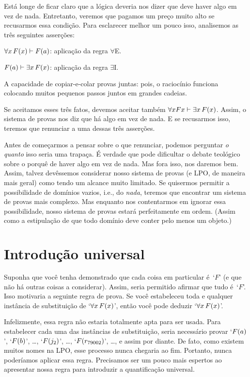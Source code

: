  
Est\'a longe de ficar claro que a l\'ogica deveria nos dizer que deve haver algo em vez de nada. Entretanto, veremos que pagamos um pre\c co muito alto se recusarmos essa condi\c c\~ao. Para esclarecer melhor um pouco isso, analisemos as tr\^es seguintes asser\c c\~oes:
	\begin{ebullet}
		\item $\forall x\,\mathord{F}(x) \vdash \mathord{F}(a)$:  aplica\c c\~ao da regra  $\forall$E.
		\item $\mathord{F}(a) \vdash \exists x\,\mathord{F}(x)$:  aplica\c c\~ao da regra $\exists$I.
		\item A capacidade de copiar-e-colar provas juntas: pois, o racioc\'inio funciona colocando muitos pequenos passos juntos em grandes cadeias.
	\end{ebullet}
Se aceitamos esses tr\^es fatos, devemos aceitar tamb\'em $\forall xFx \vdash \exists x\,\mathord{F}(x)$.  Assim, o sistema de provas nos diz que h\'a algo em vez de nada. E se recusarmos isso, teremos que renunciar a uma dessas tr\^es asser\c c\~oes. 


Antes de come\c carmos a pensar sobre o que renunciar, podemos perguntar \emph{o quanto} isso seria uma trapa\c ca. \'E verdade que pode dificultar o debate teol\'ogico sobre o porqu\^e de haver algo em vez de nada. Mas fora isso, nos daremos bem. Assim, talvez dev\^essemos considerar nosso sistema de provas (e LPO, de maneira mais geral) como tendo um alcance muito limitado. Se quisermos permitir a possibilidade de dom\'inios vazios, i.e., do \emph{nada}, teremos que encontrar um sistema de provas mais complexo. Mas enquanto nos contentarmos em ignorar essa possibilidade, nosso sistema de provas estar\'a perfeitamente em ordem. (Assim como a estipula\c c\~ao de que todo dom\'inio deve conter pelo menos um objeto.)

\section{Introdu\c c\~ao universal}
Suponha que voc\^e tenha demonstrado que cada coisa em particular \'e~`$F$' (e que n\~ao h\'a outras coisas a considerar). Assim, seria permitido afirmar que tudo \'e~`$F$'. Isso motivaria a seguinte regra de prova. Se voc\^e estabeleceu toda e qualquer inst\^ancia de substitui\c c\~ao de `$\forall x\,\mathord{F}(x)$', ent\~ao voc\^e pode deduzir `$\forall x\,\mathord{F}(x)$'. 
 
 Infelizmente, essa regra n\~ao estaria  totalmente apta para ser usada. Para estabelecer cada uma das inst\^ancias de substitui\c c\~ao, seria necess\'ario provar  `$\mathord{F}(a)$', `$\mathord{F}(b)$', \dots, `$\mathord{F}(j_2)$', \dots, `$\mathord{F}(r_{79002})$', \ldots, e assim por diante. De fato, como existem muitos nomes na LPO, esse processo nunca chegaria ao fim. Portanto, nunca poder\'iamos aplicar essa regra. Precisamos ser um pouco mais espertos ao apresentar nossa regra para introduzir a quantifica\c c\~ao universal.
 
